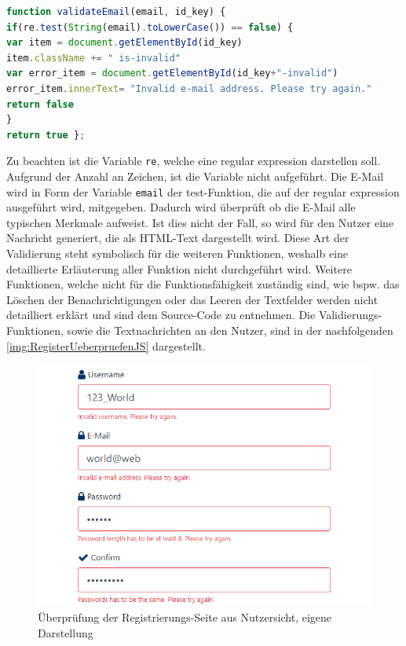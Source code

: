 \documentclass[a4paper,titlepage,halfparskip,12pt]{scrreprt}
\begin{document}
\begin{onehalfspacing}
\begin{lstlisting}[language=Javascript,caption=Validierungsfunktion \textit{validateEmail()},label={lst:RegisterValidateFunction}]
function validateEmail(email, id_key) {
if(re.test(String(email).toLowerCase()) == false) {
var item = document.getElementById(id_key)
item.className += " is-invalid"
var error_item = document.getElementById(id_key+"-invalid")
error_item.innerText= "Invalid e-mail address. Please try again."
return false
}
return true };
\end{lstlisting}
Zu beachten ist die Variable \texttt{re}, welche eine regular expression darstellen soll. Aufgrund der Anzahl an Zeichen, ist die Variable nicht aufgeführt. Die E-Mail wird in Form der Variable \texttt{email} der test-Funktion, die auf der regular expression ausgeführt wird, mitgegeben. Dadurch wird überprüft ob die E-Mail alle typischen Merkmale aufweist. Ist dies nicht der Fall, so wird für den Nutzer eine Nachricht generiert, die als \ac{HTML}-Text dargestellt wird. Diese Art der Validierung steht symbolisch für die weiteren Funktionen, weshalb eine detaillierte Erläuterung aller Funktion nicht durchgeführt wird. Weitere Funktionen, welche nicht für die Funktionsfähigkeit zuständig sind, wie bspw. das Löschen der Benachrichtigungen oder das Leeren der Textfelder werden nicht detailliert erklärt und sind dem Source-Code zu entnehmen. Die Validierungs-Funktionen, sowie die Textnachrichten an den Nutzer, sind in der nachfolgenden \autoref{img:RegisterUeberpruefenJS} dargestellt.
\begin{figure}[h]
	\centering
	\includegraphics[scale=1.25]{images/RegisterUeberpruefenJS}
	\caption{Überprüfung der Registrierungs-Seite aus Nutzersicht, eigene Darstellung}
	\label{img:RegisterUeberpruefenJS}
\end{figure}\\

\end{onehalfspacing}
\end{document}
